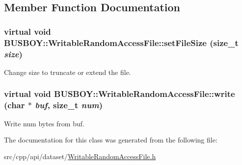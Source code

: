\subsection{Member Function Documentation}
\hypertarget{classBUSBOY_1_1WritableRandomAccessFile_a6d1605760b7c1f8339a54701f7a6a6fe}{
\subsubsection[{setFileSize}]{\setlength{\rightskip}{0pt plus 5cm}virtual void BUSBOY::WritableRandomAccessFile::setFileSize (size\_\-t {\em size})}}
\label{classBUSBOY_1_1WritableRandomAccessFile_a6d1605760b7c1f8339a54701f7a6a6fe}


Change size to truncate or extend the file. \hypertarget{classBUSBOY_1_1WritableRandomAccessFile_a9b0f6b64a1fd45d9405c882dc334b8dd}{
\subsubsection[{write}]{\setlength{\rightskip}{0pt plus 5cm}virtual void BUSBOY::WritableRandomAccessFile::write (char $\ast$ {\em buf}, \/  size\_\-t {\em num})}}
\label{classBUSBOY_1_1WritableRandomAccessFile_a9b0f6b64a1fd45d9405c882dc334b8dd}


Write num bytes from buf. 

The documentation for this class was generated from the following file:\begin{DoxyCompactItemize}
\item 
src/cpp/api/dataset/\hyperlink{WritableRandomAccessFile_8h}{WritableRandomAccessFile.h}\end{DoxyCompactItemize}
